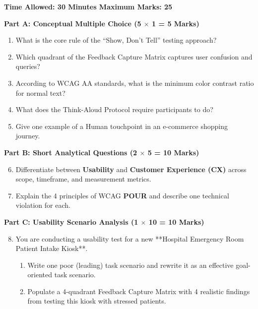\begin{chaptertest}
\textbf{Time Allowed: 30 Minutes \hfill Maximum Marks: 25}

\vspace{0.4cm}
\noindent\textbf{Part A: Conceptual Multiple Choice (5 $\times$ 1 = 5 Marks)}
\begin{enumerate}[leftmargin=1.2em, itemsep=2pt]
    \item What is the core rule of the ``Show, Don't Tell'' testing approach?
    \item Which quadrant of the Feedback Capture Matrix captures user confusion and queries?
    \item According to WCAG AA standards, what is the minimum color contrast ratio for normal text?
    \item What does the Think-Aloud Protocol require participants to do?
    \item Give one example of a Human touchpoint in an e-commerce shopping journey.
\end{enumerate}

\vspace{0.3cm}
\noindent\textbf{Part B: Short Analytical Questions (2 $\times$ 5 = 10 Marks)}
\begin{enumerate}[leftmargin=1.2em, itemsep=4pt]
    \setcounter{enumi}{5}
    \item Differentiate between \textbf{Usability} and \textbf{Customer Experience (CX)} across scope, timeframe, and measurement metrics.
    \item Explain the 4 principles of WCAG \textbf{POUR} and describe one technical violation for each.
\end{enumerate}

\vspace{0.3cm}
\noindent\textbf{Part C: Usability Scenario Analysis (1 $\times$ 10 = 10 Marks)}
\begin{enumerate}[leftmargin=1.2em, itemsep=4pt]
    \setcounter{enumi}{7}
    \item You are conducting a usability test for a new **Hospital Emergency Room Patient Intake Kiosk**.
    \begin{enumerate}[label=(\alph*)]
        \item Write one poor (leading) task scenario and rewrite it as an effective goal-oriented task scenario.
        \item Populate a 4-quadrant Feedback Capture Matrix with 4 realistic findings from testing this kiosk with stressed patients.
    \end{enumerate}
\end{enumerate}
\end{chaptertest}

